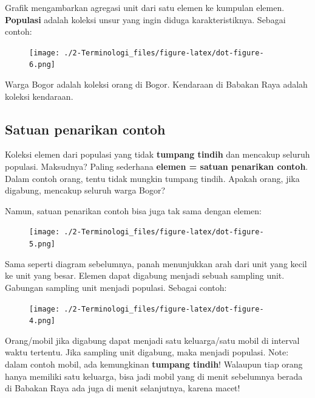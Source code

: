 \documentclass[
  letterpaper,
  DIV=11,
  numbers=noendperiod]{scrreprt}
\begin{document}
Grafik mengambarkan agregasi unit dari satu elemen ke kumpulan elemen.
\textbf{Populasi} adalah koleksi unsur yang ingin diduga
karakteristiknya. Sebagai contoh:

\begin{figure}[H]

{\centering \texttt{[image: ./2-Terminologi\_files/figure-latex/dot-figure-6.png]}

}

\end{figure}

Warga Bogor adalah koleksi orang di Bogor. Kendaraan di Babakan Raya
adalah koleksi kendaraan.

\hypertarget{satuan-penarikan-contoh}{%
\subsection{Satuan penarikan contoh}\label{satuan-penarikan-contoh}}

Koleksi elemen dari populasi yang tidak \textbf{tumpang tindih} dan
mencakup seluruh populasi. Maksudnya? Paling sederhana \textbf{elemen =
satuan penarikan contoh}. Dalam contoh orang, tentu tidak mungkin
tumpang tindih. Apakah orang, jika digabung, mencakup seluruh warga
Bogor?

Namun, satuan penarikan contoh bisa juga tak sama dengan elemen:

\begin{figure}[H]

{\centering \texttt{[image: ./2-Terminologi\_files/figure-latex/dot-figure-5.png]}

}

\end{figure}

Sama seperti diagram sebelumnya, panah menunjukkan arah dari unit yang
kecil ke unit yang besar. Elemen dapat digabung menjadi sebuah sampling
unit. Gabungan sampling unit menjadi populasi. Sebagai contoh:

\begin{figure}[H]

{\centering \texttt{[image: ./2-Terminologi\_files/figure-latex/dot-figure-4.png]}

}

\end{figure}

Orang/mobil jika digabung dapat menjadi satu keluarga/satu mobil di
interval waktu tertentu. Jika sampling unit digabung, maka menjadi
populasi. Note: dalam contoh mobil, ada kemungkinan \textbf{tumpang
tindih}! Walaupun tiap orang hanya memiliki satu keluarga, bisa jadi
mobil yang di menit sebelumnya berada di Babakan Raya ada juga di menit
selanjutnya, karena macet!
\end{document}
